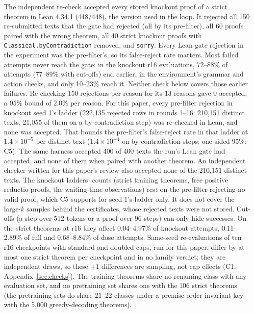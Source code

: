 The independent re-check accepted every stored knockout proof of a strict theorem in Lean 4.34.1 (448/448), the version
used in the loop. It rejected all 150 re-submitted texts that the gate had rejected (all by its pre-filter), all 60 proofs paired with the wrong theorem, all 40
strict knockout proofs with \texttt{Classical.byContradiction} removed, and \texttt{sorry}. Every Lean-gate
rejection in the experiment was the pre-filter's, so its false-reject rate matters. Most failed attempts never reach the
gate: in the knockout r16 evaluations, 72--88\% of attempts (77--89\% with cut-offs) end earlier, in the environment's
grammar and action checks, and only 10--23\% reach it. Neither check below covers those earlier failures. Re-checking 150 rejections per reason for its 13
reasons gave 0 accepted, a 95\% bound of 2.0\% per reason. For this paper, every pre-filter rejection in knockout
seed 1's ladder (222,135 rejected rows in rounds 1--16: 210,151 distinct texts, 21,055 of them on a by-contradiction
step) was re-checked in Lean, and none was accepted. That bounds the pre-filter's false-reject rate in that ladder
at $1.4\times10^{-5}$ per distinct text ($1.4\times10^{-4}$ on by-contradiction steps; one-sided 95\%; C5). The
same harness accepted 400 of 400 texts the run's Lean gate had accepted, and none of them when paired with another
theorem. An independent checker written for this paper's review also accepted none of the 210,151 distinct texts.
The knockout ladders' counts (strict training theorems,
free positive reductio proofs, the waiting-time observations) rest on the pre-filter rejecting no valid proof, which C5
supports for seed 1's ladder only. It does not cover the large-$k$ samples behind the certificates, whose rejected texts
were not stored. Cut-offs (a step over 512 tokens or a proof over 96 steps) can only hide successes. On the strict theorems at r16
they affect 0.04--4.97\% of knockout attempts, 0.11--2.89\% of full and 0.68--8.84\% of dose attempts. Same-seed
re-evaluations of ten r16 checkpoints with standard and doubled caps, run for this paper, differ by at most one strict
theorem per checkpoint and in no family verdict; they are independent draws, so these $\pm1$ differences are sampling,
not cap effects (C1, Appendix~\ref{sec:checks}). The training theorems share no renaming class with any evaluation set, and no
pretraining set shares one with the 106 strict theorems (the pretraining sets do share 21--22 classes under a
premise-order-invariant key with the 5,000 greedy-decoding theorems).
